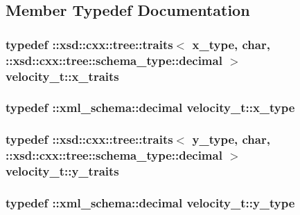 \subsection{Member Typedef Documentation}
\hypertarget{classvelocity__t_a2fed2e212062cdd498a218d3c0ac8308}{
\subsubsection[{x\-\_\-traits}]{\setlength{\rightskip}{0pt plus 5cm}typedef \-::xsd\-::cxx\-::tree\-::traits$<$ {\bf x\-\_\-type}, char, \-::xsd\-::cxx\-::tree\-::schema\-\_\-type\-::decimal $>$ {\bf velocity\-\_\-t\-::x\-\_\-traits}}}\label{classvelocity__t_a2fed2e212062cdd498a218d3c0ac8308}
\hypertarget{classvelocity__t_a96ff8f29edf435cfe0966409d22b33c7}{
\subsubsection[{x\-\_\-type}]{\setlength{\rightskip}{0pt plus 5cm}typedef \-::{\bf xml\-\_\-schema\-::decimal} {\bf velocity\-\_\-t\-::x\-\_\-type}}}\label{classvelocity__t_a96ff8f29edf435cfe0966409d22b33c7}
\hypertarget{classvelocity__t_a315747a86c40ace5db31652413ae56a2}{
\subsubsection[{y\-\_\-traits}]{\setlength{\rightskip}{0pt plus 5cm}typedef \-::xsd\-::cxx\-::tree\-::traits$<$ {\bf y\-\_\-type}, char, \-::xsd\-::cxx\-::tree\-::schema\-\_\-type\-::decimal $>$ {\bf velocity\-\_\-t\-::y\-\_\-traits}}}\label{classvelocity__t_a315747a86c40ace5db31652413ae56a2}
\hypertarget{classvelocity__t_aab88921abbd89667cc4d293a448877f3}{
\subsubsection[{y\-\_\-type}]{\setlength{\rightskip}{0pt plus 5cm}typedef \-::{\bf xml\-\_\-schema\-::decimal} {\bf velocity\-\_\-t\-::y\-\_\-type}}}\label{classvelocity__t_aab88921abbd89667cc4d293a448877f3}
